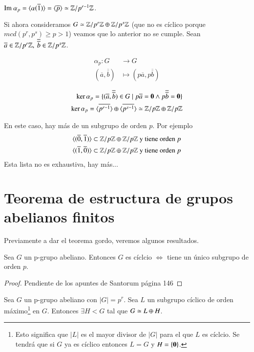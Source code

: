 \begin{obs}
	$\text{Im } \alpha_p = \langle\alpha(\overline{1})\rangle = \langle\overline{p}\rangle \simeq \mathbb{Z}/p^{r-1}\mathbb{Z}$.
\end{obs}

Si ahora consideramos $G \simeq \mathbb{Z}/p^r\mathbb{Z} \oplus \mathbb{Z}/p^s\mathbb{Z}$ (que no es cíclico porque $mcd(p^r, p^s) \geq p > 1$) veamos que lo anterior no se cumple. Sean $\overline{a} \in \mathbb{Z}/p^r\mathbb{Z},\ \overline{\overline{b}} \in \mathbb{Z}/p^s\mathbb{Z}$.

\begin{align*}
	\alpha_p : G &\to G \\
	(\overline{a}, \overline{\overline{b}}) &\mapsto (p\overline{a}, p\overline{\overline{b}}) \\
\end{align*}
\begin{align*}
	\ker \alpha_p = \{(\overline{a}, \overline{\overline{b}}) \in G \mid p \overline{a} = \mathbf{0} \land p\overline{\overline{b}} = \mathbf{0}\} \\
	\ker \alpha_p = \langle\overline{p^{r-1}}\rangle \oplus \langle\overline{p^{s-1}}\rangle \simeq \mathbb{Z}/p\mathbb{Z} \oplus \mathbb{Z}/p\mathbb{Z}
\end{align*}

En este caso, hay más de un subgrupo de orden $p$. Por ejemplo
\begin{align*}
	\langle(\overline{0}, \overline{1})\rangle &\subset \mathbb{Z}/p\mathbb{Z} \oplus \mathbb{Z}/p\mathbb{Z}\text{ y tiene orden } p \\
	\langle(\overline{1}, \overline{0})\rangle &\subset \mathbb{Z}/p\mathbb{Z} \oplus \mathbb{Z}/p\mathbb{Z}\text{ y tiene orden } p
\end{align*}
Esta lista no es exhaustiva, hay más...

\section{Teorema de estructura de grupos abelianos finitos}

Previamente a dar el teorema gordo, veremos algunos resultados.

\begin{pro}
	Sea $G$ un p-grupo abeliano. Entonces $G$ es cíclcio $\iff$ tiene un único subgrupo de orden $p$.
\end{pro}

\begin{proof}
	Pendiente de los apuntes de Santorum página 146 %
\end{proof}

\begin{pro}
	Sea $G$ un p-grupo abeliano con $|G| = p^r$. Sea $L$ un subgrupo cíclico de orden máximo\footnote{Esto significa que $|L|$ es el mayor divisor de $|G|$ para el que $L$ es cíclcio. Se tendrá que si $G$ ya es cíclico entonces $L = G$ y $H = \{\mathbf{0}\}$.} en $G$. Entonces $\exists H < G$ tal que $G \simeq L \oplus H$.
\end{pro}

